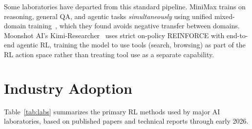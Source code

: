 \documentclass[12pt]{article}
\begin{document}
Some laboratories have departed from this standard pipeline. MiniMax trains on reasoning, general QA, and agentic tasks \textit{simultaneously} using unified mixed-domain training~\cite{MiniMax2025Forge}, which they found avoids negative transfer between domains. Moonshot AI's Kimi-Researcher~\cite{Kimi2025Researcher} uses strict on-policy REINFORCE with end-to-end agentic RL, training the model to use tools (search, browsing) as part of the RL action space rather than treating tool use as a separate capability.


\section{Industry Adoption}

Table~\ref{tab:labs} summarizes the primary RL methods used by major AI laboratories, based on published papers and technical reports through early 2026.
\end{document}
